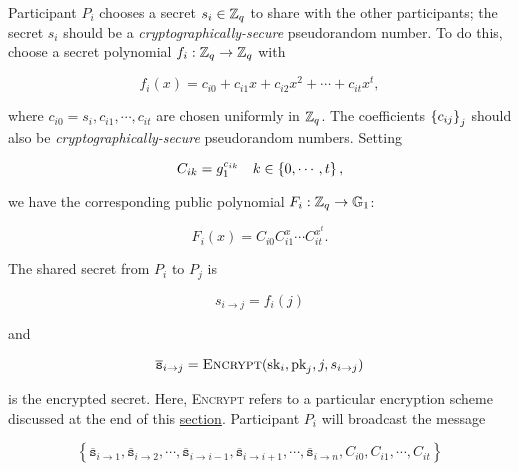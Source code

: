 Participant $P_{i}$ chooses a secret
$s_{i}\in\mathbb{Z}_{q}$ to share with the other participants;
the secret $s_{i}$ should be a
\emph{cryptographically-secure} pseudorandom number.
To do this, choose a secret polynomial $f_{i}:\mathbb{Z}_{q}\to\mathbb{Z}_{q}$
with

\begin{equation}
    f_{i}(x) = c_{i0} + c_{i1}x + c_{i2}x^{2} + \cdots + c_{it}x^{t},
\end{equation}

\noindent
where $c_{i0} = s_{i}, c_{i1}, \cdots, c_{it}$ are chosen uniformly
in $\mathbb{Z}_{q}$.
The coefficients $\left\{ c_{ij} \right\}_{j}$ should also be 
\emph{cryptographically-secure} pseudorandom numbers.
Setting

\begin{equation}
    C_{ik} = g_{1}^{c_{ik}}\quad k\in\left\{ 0,\cdots,t \right\},
\end{equation}

\noindent
we have the corresponding public polynomial $F_{i}:\mathbb{Z}_{q}\to\mathbb{G}_{1}$:

\begin{equation}
    F_{i}(x) = C_{i0}C_{i1}^{x}\cdots C_{it}^{x^{t}}.
\end{equation}

\noindent
The shared secret from $P_{i}$ to $P_{j}$ is

\begin{equation}
    s_{i\to j} = f_{i}(j)
\end{equation}

\noindent
and

\begin{equation}
    \overline{\texttt{s}}_{i\to j} =
        \textsc{Encrypt}(\text{sk}_{i},\text{pk}_{j},j, s_{i\to j})
\end{equation}

\noindent
is the encrypted secret.
Here, \textsc{Encrypt} refers to a particular encryption scheme discussed
at the end of this \hyperref[par:secret_enc]{section}.
Participant $P_{i}$ will broadcast the message

\begin{equation}
    \left\{ 
        \overline{\texttt{s}}_{i\to 1}, \overline{\texttt{s}}_{i\to 2},
            \cdots,
            \overline{\texttt{s}}_{i\to i-1},
            \overline{\texttt{s}}_{i\to i+1},
            \cdots,
            \overline{\texttt{s}}_{i\to n},
        C_{i0}, C_{i1}, \cdots, C_{it}
    \right\}
\end{equation}

